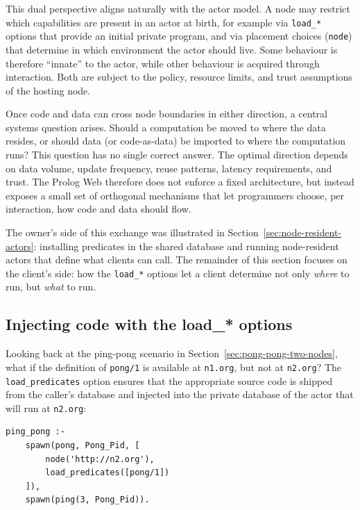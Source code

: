 This dual perspective aligns naturally with the actor model. A node
may restrict which capabilities are present in an actor at birth,
for example via \texttt{load\_*} options that provide an initial
private program, and via placement choices (\texttt{node}) that
determine in which environment the actor should live. Some behaviour
is therefore ``innate'' to the actor, while other behaviour is
acquired through interaction. Both are subject to the policy,
resource limits, and trust assumptions of the hosting node.

Once code and data can cross node boundaries in either direction, a
central systems question arises. Should a computation be moved to
where the data resides, or should data (or code-as-data) be imported
to where the computation runs? This question has no single correct
answer. The optimal direction depends on data volume, update
frequency, reuse patterns, latency requirements, and trust. The
Prolog Web therefore does not enforce a fixed architecture, but
instead exposes a small set of orthogonal mechanisms that let
programmers choose, per interaction, how code and data should flow.

The owner's side of this exchange was illustrated in
Section~\ref{sec:node-resident-actors}: installing predicates in
the shared database and running node-resident actors that define
what clients can call. The remainder of this section focuses on the
client's side: how the \texttt{load\_*} options let a client
determine not only \emph{where} to run, but \emph{what} to run.


\subsection{Injecting code with the load\_* options}
\label{sec:injecting-code}

Looking back at the ping-pong scenario in
Section~\ref{sec:pong-pong-two-nodes}, what if the definition of
\texttt{pong/1} is available at \texttt{n1.org}, but not at
\texttt{n2.org}? The \texttt{load\_predicates} option ensures that
the appropriate source code is shipped from the caller's database
and injected into the private database of the actor that will run at
\texttt{n2.org}:

\begin{verbatim}
ping_pong :-
    spawn(pong, Pong_Pid, [
        node('http://n2.org'),
        load_predicates([pong/1])
    ]),
    spawn(ping(3, Pong_Pid)).
\end{verbatim}

